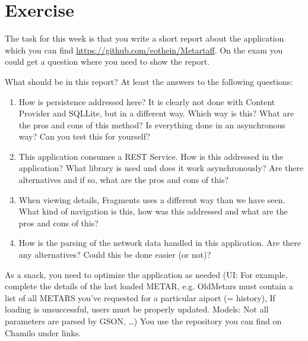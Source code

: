 \section{Exercise}
\begin{exercise}
	The task for this week is that you write a short report about the application which you can find \href{Uhttps://github.com/eothein/MetartaffRL}{https://github.com/eothein/Metartaff}. On the exam you could get a question where you need to show the report.
	
	What should be in this report? At least the answers to the following questions:
	\begin{enumerate}
		\item How is persistence addressed here? It is clearly not done with Content Provider and SQLLite, but in a different way. Which way is this? What are the pros and cons of this method? Is everything done in an asynchronous way? Can you test this for yourself?
		
		\item This application consumes a REST Service. How is this addressed in the application? What library is used and does it work asynchronously? Are there alternatives and if so, what are the pros and cons of this?
		\item When viewing details, Fragments uses a different way than we have seen. What kind of navigation is this, how was this addressed and what are the pros and cons of this?
		\item How is the parsing of the network data handled in this application. Are there any alternatives? Could this be done easier (or not)?
	\end{enumerate}
\end{exercise}

\begin{exercise}
	As a snack, you need to optimize the application as needed (UI: For example, complete the details of the last loaded METAR, e.g. OldMetars must contain a list of all METARS you've requested for a particular aiport (= history), If loading is unsuccessful, users must be properly updated. Models: Not all parameters are parsed by GSON, \dots) You use the repository you can find on Chamilo under links.
\end{exercise}